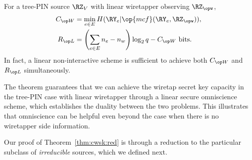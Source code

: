   
\begin{theorem}\label{thm:cwsk:red} 
For a tree-PIN source $\RZ_V$ with linear wiretapper observing $\RZ_{\opw}$,
\begin{align*}
\wskc &= \min_{e \in E} H(\RY_e|\op{mcf}(\RY_e,\RZ_{\opw})),  \\ 
\rl &=\left(\sum_{e \in E}n_e -n_w\right)\log_2q -\wskc \text{ bits}.
\end{align*}
In fact, a linear non-interactive scheme  is  sufficient to achieve both $\wskc$ and $\rl$ simultaneously.
\end{theorem}


 The theorem guarantees that we can achieve the wiretap secret key capacity in the tree-PIN case with linear wiretapper through a linear secure omniscience scheme, which establishes the duality between the two problems. This illustrates that omniscience can be helpful even beyond the case when there is no wiretapper side information.

 Our proof of Theorem~\ref{thm:cwsk:red} is through a reduction to the particular subclass of \emph{irreducible} sources, which we defined next.
 
